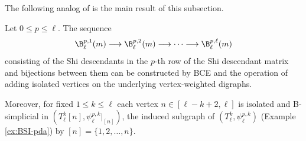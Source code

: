 The following analog of \cite[Proposition 7.16]{MRT24} is the main result of this subsection.
\begin{theorem}
 \label{thm:BSI-seq}
Let  $0 \le p \le \ell$.
The sequence  
$$ \B^{p,1}_\ell(m) \longrightarrow \B^{p,2}_\ell(m)\longrightarrow \cdots\longrightarrow \B^{p,\ell}_\ell(m)$$
consisting of the Shi descendants in the $p$-th row of the Shi descendant matrix and bijections between them can be constructed by BCE and the operation of adding isolated vertices on the underlying vertex-weighted digraphs. 

Moreover, for fixed $1 \le k \le \ell$ each vertex $n \in [\ell-k+2, \ell] $ is isolated and B-simplicial in  $ (T_{\ell}^{k}[n], \psi_{\ell}^{p,k}|_{[n]})$, the induced subgraph of $(T_{\ell}^{k}, \psi_{\ell}^{p,k})$ (Example \ref{ex:BSI-pda}) by $[n]=\{1,2,\ldots,n\}$.
 \end{theorem} 
